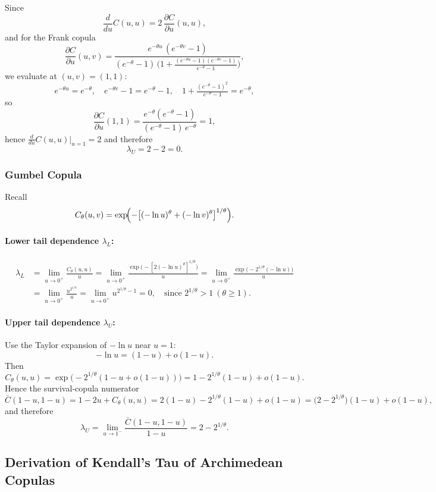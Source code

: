\documentclass[11pt]{article}
\begin{document}
Since
\[
\frac{d}{du}C(u,u)
=2\,\frac{\partial C}{\partial u}(u,u),
\]
and for the Frank copula
\[
\frac{\partial C}{\partial u}(u,v)
=\frac{e^{-\theta u}\,(e^{-\theta v}-1)}
     {(e^{-\theta}-1)\,\bigl(1+\frac{(e^{-\theta u}-1)(e^{-\theta v}-1)}{e^{-\theta}-1}\bigr)},
\]
we evaluate at \((u,v)=(1,1)\):
\[
e^{-\theta u}=e^{-\theta},\quad e^{-\theta v}-1=e^{-\theta}-1,
\quad 1+\tfrac{(e^{-\theta}-1)^2}{e^{-\theta}-1}=e^{-\theta},
\]
so
\[
\frac{\partial C}{\partial u}(1,1)
=\frac{e^{-\theta}(e^{-\theta}-1)}{(e^{-\theta}-1)\,e^{-\theta}}=1,
\]
hence \(\tfrac{d}{du}C(u,u)\big|_{u=1}=2\) and therefore
\[
\lambda_U
=2-2
=0.
\]

\subsubsection{Gumbel Copula}
Recall
\[
C_\theta(u,v)
=\exp\!\Bigl(-\bigl[(-\ln u)^\theta+(-\ln v)^\theta\bigr]^{1/\theta}\Bigr).
\]

\paragraph{Lower tail dependence \(\lambda_L\):}
\begin{align*}
\lambda_L
&=\lim_{u\to0^+}\frac{C_\theta(u,u)}{u}
=\lim_{u\to0^+}\frac{\exp\!\bigl(-[2(-\ln u)^\theta]^{1/\theta}\bigr)}{u}
=\lim_{u\to0^+}\frac{\exp\!\bigl(-2^{1/\theta}(-\ln u)\bigr)}{u}\\
&=\lim_{u\to0^+}\frac{u^{2^{1/\theta}}}{u}
=\lim_{u\to0^+}u^{2^{1/\theta}-1}
=0,
\quad\text{since }2^{1/\theta}>1\ (\theta\ge1).
\end{align*}

\paragraph{Upper tail dependence \(\lambda_U\):}
Use the Taylor expansion of \(-\ln u\) near \(u=1\):
\[
-\ln u = (1-u)+o(1-u).
\]
Then
\[
C_\theta(u,u)
=\exp\bigl(-2^{1/\theta}(1-u+o(1-u))\bigr)
=1 - 2^{1/\theta}(1-u) + o(1-u).
\]
Hence the survival‐copula numerator
\[
\overline{C}(1-u,1-u)
=1 - 2u + C_\theta(u,u)
=2(1-u) - 2^{1/\theta}(1-u) + o(1-u)
=\bigl(2-2^{1/\theta}\bigr)(1-u)+o(1-u),
\]
and therefore
\[
\lambda_U
=\lim_{u\to1^-}\frac{\overline{C}(1-u,1-u)}{1-u}
=2 - 2^{1/\theta}.
\]

\subsection{Derivation of Kendall's Tau of Archimedean Copulas}
\end{document}

